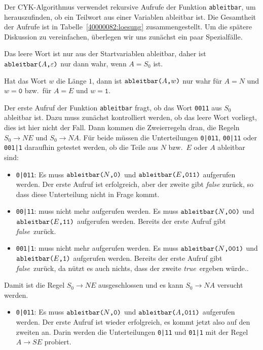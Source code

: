 \begin{loesung}
Der CYK-Algorithmus verwendet rekursive Aufrufe der Funktion
\texttt{ableitbar}, um herauszufinden, ob ein Teilwort aus einer 
Variablen ableitbar ist.
Die Gesamtheit der Aufrufe ist in Tabelle~\ref{40000082:loesung}
zusammengestellt.
Um die spätere Diskussion zu vereinfachen, überlegen wir uns zunächst
ein paar Spezialfälle.

Das leere Wort ist nur aus der Startvariablen ableitbar, daher ist
$\a{A}{\varepsilon}{}$ nur dann wahr, wenn $A=S_0$ ist.

Hat das Wort $w$ die Länge $1$, dann ist 
$\a{A}{w}{}$ nur wahr
für $A=N$ und $w=\texttt{0}$
bzw.~für $A=E$ und $w=\texttt{1}$.

Der erste Aufruf der Funktion \texttt{ableitbar} fragt, ob das Wort
\texttt{0011} aus $S_0$ ableitbar ist.
Dazu muss zunächst kontrolliert werden, ob das leere Wort vorliegt,
dies ist hier nicht der Fall.
Dann kommen die Zweierregeln dran, die Regeln
$S_0\to NE$
und
$S_0\to NA$.
Für beide müssen die Unterteilungen
\texttt{0|011},
\texttt{00|11} oder
\texttt{001|1}
daraufhin getestet werden, ob die Teile aus $N$ bzw.~$E$ oder $A$
ableitbar sind:
\begin{itemize}
\item
\texttt{0|011}:
Es muss $\a{N}{\texttt{0}}{}$ und $\a{E}{\texttt{011}}{}$ 
aufgerufen werden.
Der erste Aufruf ist erfolgreich, aber der zweite gibt {\em false} zurück,
so dass diese Unterteilung nicht in Frage kommt.
\item
\texttt{00|11}: muss nicht mehr aufgerufen werden.
Es muss $\a{N}{\texttt{00}}{}$ und $\a{E}{\texttt{11}}{}$
aufgerufen werden.
Bereits der erste Aufruf gibt {\em false} zurück.
\item
\texttt{001|1}: muss nicht mehr aufgerufen werden.
Es muss $\a{N}{\texttt{001}}{}$ und $\a{E}{\texttt{1}}{}$
aufgerufen werden.
Bereits der erste Aufruf gibt {\em false} zurück, da nützt es auch
nichts, dass der zweite {\em true} ergeben würde..
\end{itemize}
Damit ist die Regel $S_0\to NE$ ausgeschlossen und es kann $S_0\to NA$
versucht werden.
\begin{itemize}
\item
\texttt{0|011}:
Es muss $\a{N}{\texttt{0}}{}$ und $\a{A}{\texttt{011}}{}$ 
aufgerufen werden.
Der erste Aufruf ist wieder erfolgreich, es kommt jetzt also auf den
zweiten an.
Darin werden die Unterteilungen \texttt{0|11} und \texttt{01|1}
mit der Regel $A\to SE$ probiert.
\begin{itemize}

\end{itemize}
\end{itemize}
\end{loesung}
